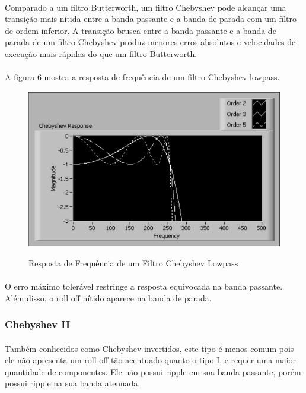 \documentclass[12pt,fleqn]{article}
\begin{document}
\paragraph{} Comparado a um filtro Butterworth, um filtro Chebyshev pode alcançar uma transição mais nítida entre a banda passante e a banda de parada com um filtro de ordem inferior. A transição brusca entre a banda passante e a banda de parada de um filtro Chebyshev produz menores erros absolutos e velocidades de execução mais rápidas do que um filtro Butterworth.

\paragraph{} A figura 6 mostra a resposta de frequência de um filtro Chebyshev lowpass.

\begin{figure}[!htb]
    \centering
    \includegraphics[scale=0.5]{fig/figura6.png}
    \label{figura:figura2}
    \caption{Resposta de Frequência de um Filtro Chebyshev Lowpass}
\end{figure}

\paragraph{} O erro máximo tolerável restringe a resposta equivocada na banda passante. Além disso, o roll off nítido aparece na banda de parada.

\subsubsection{Chebyshev II}
\paragraph{} Também conhecidos como Chebyshev invertidos, este tipo é menos comum pois ele não apresenta um roll off tão acentuado quanto o tipo I, e requer uma maior quantidade de componentes. Ele não possui ripple em sua banda passante, porém possui ripple na sua banda atenuada.
\end{document}
